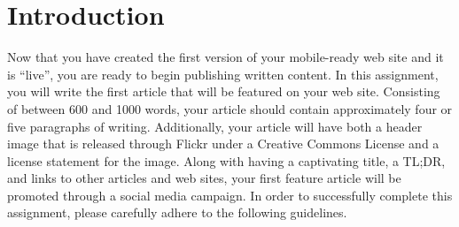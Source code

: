 

\usepackage[compact]{titlesec}




\vspace*{-.2in}
\section*{Introduction}

Now that you have created the first version of your mobile-ready web site and it is ``live'', you are ready to begin
publishing written content. In this assignment, you will write the first article that will be featured on your web site.
Consisting of between 600 and 1000 words, your article should contain approximately four or five paragraphs of writing.
Additionally, your article will have both a header image that is released through Flickr under a Creative Commons
License and a license statement for the image. Along with having a captivating title, a TL;DR, and links to other
articles and web sites, your first feature article will be promoted through a social media campaign. In order to
successfully complete this assignment, please carefully adhere to the following guidelines.

